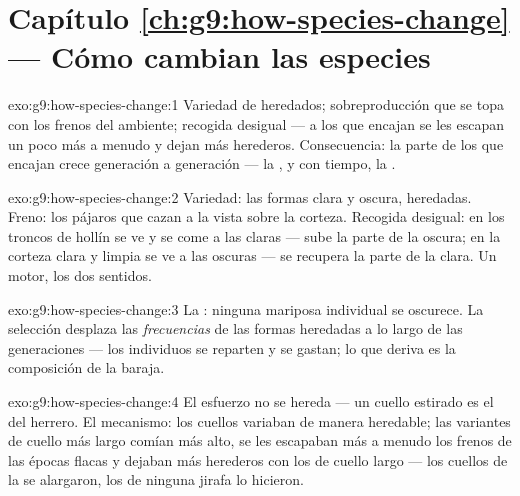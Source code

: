 \section*{Capítulo \ref{ch:g9:how-species-change} --- Cómo cambian las especies}

\begin{solution}{exo:g9:how-species-change:1}
Variedad de  heredados; sobreproducción que se topa con los
frenos del ambiente; recogida desigual --- a los que encajan se les
escapan un poco más a menudo y dejan más herederos. Consecuencia: la
parte de los  que encajan crece generación a generación --- la
, y con tiempo, la .
\end{solution}

\begin{solution}{exo:g9:how-species-change:2}
Variedad: las formas clara y oscura, heredadas. Freno: los pájaros que
cazan a la vista sobre la corteza. Recogida desigual: en los troncos de
hollín se ve y se come a las claras --- sube la parte de la oscura; en
la corteza clara y limpia se ve a las oscuras --- se recupera la parte
de la clara. Un motor, los dos sentidos.
\end{solution}

\begin{solution}{exo:g9:how-species-change:3}
La : ninguna mariposa individual se oscurece. La selección
desplaza las \emph{frecuencias} de las formas heredadas a lo largo de
las generaciones --- los individuos se reparten y se gastan; lo que
deriva es la composición de la baraja.
\end{solution}

\begin{solution}{exo:g9:how-species-change:4}
El esfuerzo no se hereda --- un cuello estirado es el  del
herrero. El mecanismo: los cuellos variaban de manera heredable; las
variantes de cuello más largo comían más alto, se les escapaban más a
menudo los frenos de las épocas flacas y dejaban más herederos con los
 de cuello largo --- los cuellos de la  se alargaron,
los de ninguna jirafa lo hicieron.
\end{solution}

